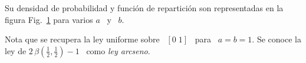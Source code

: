 Su densidad de probabilidad y funci\'on de repartici\'on son representadas en la
figura Fig.~\ref{Fig:MP:Beta} para varios $a$ \ y \ $b$.
%
\begin{figure}[h!]
\begin{center}  \end{center}
%
\label{Fig:MP:Beta}
\end{figure}

Nota que se recupera la  ley uniforme sobre \ $[0 \; 1]$ \  para \ $a = b =
1$. Se conoce la ley de $ 2 \, \beta\left( \frac12 , \frac12 \right) - 1$ \ como
{\em ley arcseno}.

